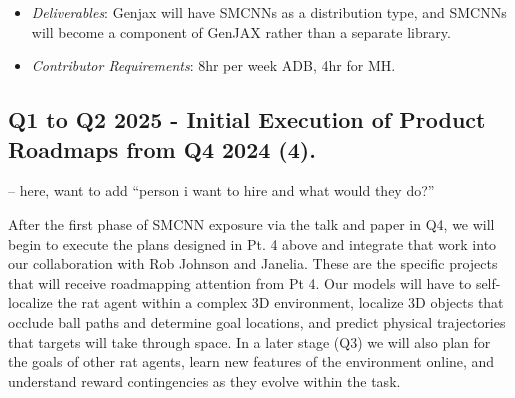 \documentclass[
  letterpaper,
  DIV=11,
  numbers=noendperiod]{scrartcl}
\providecommand{\tightlist}{%
  \setlength{\itemsep}{0pt}\setlength{\parskip}{0pt}}\usepackage{longtable,booktabs,array}
\begin{document}
\begin{enumerate}
  \begin{itemize}
  \tightlist
  \item
    \emph{Deliverables}: Genjax will have SMCNNs as a distribution type,
    and SMCNNs will become a component of GenJAX rather than a separate
    library.
  \item
    \emph{Contributor Requirements}: 8hr per week ADB, 4hr for MH.
  \end{itemize}
\end{enumerate}

\subsection{Q1 to Q2 2025 - Initial Execution of Product Roadmaps from
Q4 2024
(4).}\label{q1-to-q2-2025---initial-execution-of-product-roadmaps-from-q4-2024-4.}

-- here, want to add ``person i want to hire and what would they do?''

After the first phase of SMCNN exposure via the talk and paper in Q4, we
will begin to execute the plans designed in Pt. 4 above and integrate
that work into our collaboration with Rob Johnson and Janelia. These are
the specific projects that will receive roadmapping attention from Pt 4.
Our models will have to self-localize the rat agent within a complex 3D
environment, localize 3D objects that occlude ball paths and determine
goal locations, and predict physical trajectories that targets will take
through space. In a later stage (Q3) we will also plan for the goals of
other rat agents, learn new features of the environment online, and
understand reward contingencies as they evolve within the task.
\end{document}
